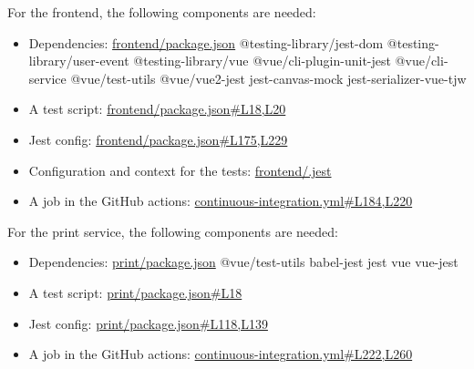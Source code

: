 \documentclass[conference]{IEEEtran}
\begin{document}
For the frontend, the following components are needed:
\begin{itemize}
	\item Dependencies: \href{https://github.com/ecamp/ecamp3/blob/7a1cf92e3eee27b0b942fcd87bd8ce5c221089b7/frontend/package.json}{frontend/package.json}
	      \subitem @testing-library/jest-dom
	      \subitem @testing-library/user-event
	      \subitem @testing-library/vue
	      \subitem @vue/cli-plugin-unit-jest
	      \subitem @vue/cli-service
	      \subitem @vue/test-utils
	      \subitem @vue/vue2-jest
	      \subitem jest-canvas-mock
	      \subitem jest-serializer-vue-tjw
	\item A test script: \href{https://github.com/ecamp/ecamp3/blob/7a1cf92e3eee27b0b942fcd87bd8ce5c221089b7/frontend/package.json#L18,L20}{frontend/package.json\#L18,L20}
	\item Jest config: \href{https://github.com/ecamp/ecamp3/blob/7a1cf92e3eee27b0b942fcd87bd8ce5c221089b7/frontend/package.json#L175,L229}{frontend/package.json\#L175,L229}
	\item Configuration and context for the tests: \href{https://github.com/ecamp/ecamp3/tree/7a1cf92e3eee27b0b942fcd87bd8ce5c221089b7/frontend/.jest}{frontend/.jest}
	\item A job in the GitHub actions: \href{https://github.com/ecamp/ecamp3/blob/7a1cf92e3eee27b0b942fcd87bd8ce5c221089b7/.github/workflows/continuous-integration.yml#L184,L220}{continuous-integration.yml\#L184,L220}
\end{itemize}

For the print service, the following components are needed:
\begin{itemize}
	\item Dependencies: \href{https://github.com/ecamp/ecamp3/blob/7a1cf92e3eee27b0b942fcd87bd8ce5c221089b7/print/package.json}{print/package.json}
	      \subitem @vue/test-utils
	      \subitem babel-jest
	      \subitem jest
	      \subitem vue
	      \subitem vue-jest
	\item A test script: \href{https://github.com/ecamp/ecamp3/blob/7a1cf92e3eee27b0b942fcd87bd8ce5c221089b7/print/package.json#L18}{print/package.json\#L18}
	\item Jest config: \href{https://github.com/ecamp/ecamp3/blob/7a1cf92e3eee27b0b942fcd87bd8ce5c221089b7/print/package.json#L118,L139}{print/package.json\#L118,L139}
	\item A job in the GitHub actions: \href{https://github.com/ecamp/ecamp3/blob/7a1cf92e3eee27b0b942fcd87bd8ce5c221089b7/.github/workflows/continuous-integration.yml#L222,L260}{continuous-integration.yml\#L222,L260}
\end{itemize}
\end{document}
